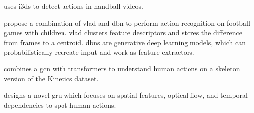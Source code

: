 \textcite{host_handball_2023} uses \acrlong{i3d}s to detect actions in handball videos. 

\textcite{chen_children_2023} propose a combination of \acrfull{vlad} and \acrfull{dbn} to perform action recognition on football games with children. \acrshort{vlad} clusters feature descriptors and stores the difference from frames to a centroid\cite{jegou_vlad_2010}. \acrshort{dbn}s are generative deep learning models, which can probabilistically recreate input and work as feature extractors\cite{hinton_dbn_2006}.

\textcite{wang_skeleton_two-stream_2023} combines a \acrfull{gcn} with transformers to understand human actions on a skeleton version of the Kinetics dataset.  

\textcite{giveki_human_2024} designs a novel \acrlong{gru} which focuses on spatial features, optical flow, and temporal dependencies to spot human actions. 